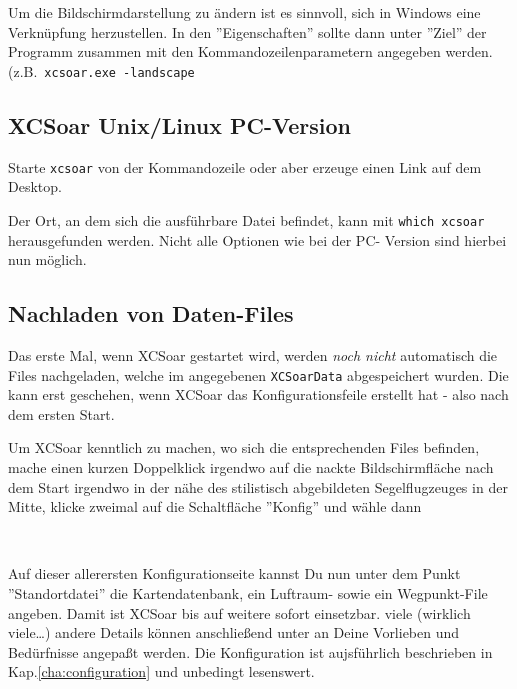 Um die Bildschirmdarstellung zu ändern ist es sinnvoll, sich in Windows eine Verknüpfung herzustellen. 
In den ''Eigenschaften'' sollte dann unter ''Ziel'' der Programm zusammen mit den Kommandozeilenparametern 
angegeben werden. (z.B.\ \texttt{xcsoar.exe -landscape}


\subsection*{{\textsf  XCSoar} Unix/Linux PC-Version}
Starte \verb|xcsoar| von der Kommandozeile oder aber erzeuge einen Link auf dem Desktop. 

Der Ort, an dem sich die ausführbare Datei befindet,  kann mit \verb|which xcsoar| herausgefunden werden.
Nicht alle Optionen wie bei der PC- Version sind hierbei nun möglich.
 
\subsection*{Nachladen von Daten-Files}
Das erste Mal, wenn {\textsf  XCSoar} gestartet wird, werden {\sl noch nicht} automatisch die Files nachgeladen, welche im 
angegebenen \verb|XCSoarData| abgespeichert wurden. Die kann erst geschehen, wenn {\textsf  XCSoar} das Konfigurationsfeile erstellt hat - also nach dem ersten Start.


Um {\textsf  XCSoar} kenntlich zu machen, wo sich die entsprechenden Files befinden, mache einen kurzen Doppelklick irgendwo auf die nackte Bildschirmfläche 
 nach dem Start irgendwo in der nähe des stilistisch abgebildeten Segelflugzeuges in der Mitte, klicke zweimal auf die Schaltfläche ''Konfig'' 
und wähle dann 
\begin{center}
~\blink~~\blink~ 
\end{center}

Auf dieser allerersten Konfigurationseite kannst Du nun unter dem Punkt ''Standortdatei''  die Kartendatenbank, ein Luftraum- sowie ein Wegpunkt-File angeben.
Damit ist {\textsf  XCSoar} bis auf weitere sofort einsetzbar.
viele (wirklich viele\dots) andere Details können anschließend unter  an Deine Vorlieben und Bedürfnisse angepaßt werden. 
Die Konfiguration  ist aujsführlich beschrieben in Kap.\ref{cha:configuration} und unbedingt lesenswert. 

